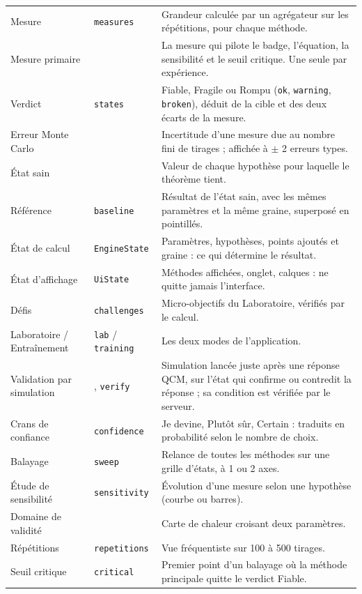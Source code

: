 \documentclass[11pt,a4paper]{article}
\begin{document}
\begin{appendices}
\begin{longtable}{@{}L{3.6cm} L{3.6cm} >{\raggedright\arraybackslash}p{\dimexpr\textwidth-7.2cm-4\tabcolsep\relax}@{}}
  Mesure & \texttt{measures} & Grandeur calculée par un agrégateur sur les répétitions, pour chaque méthode. \\
  Mesure primaire &  & La mesure qui pilote le badge, l'équation, la sensibilité et le seuil critique. Une seule par expérience. \\
  Verdict & \texttt{states} & Fiable, Fragile ou Rompu (\texttt{ok}, \texttt{warning}, \texttt{broken}), déduit de la cible et des deux écarts de la mesure. \\
  Erreur Monte Carlo &  & Incertitude d'une mesure due au nombre fini de tirages ; affichée à $\pm$ 2 erreurs types. \\
  État sain &  & Valeur de chaque hypothèse pour laquelle le théorème tient. \\
  Référence & \texttt{baseline} & Résultat de l'état sain, avec les mêmes paramètres et la même graine, superposé en pointillés. \\
  État de calcul & \texttt{EngineState} & Paramètres, hypothèses, points ajoutés et graine : ce qui détermine le résultat. \\
  État d'affichage & \texttt{UiState} & Méthodes affichées, onglet, calques : ne quitte jamais l'interface. \\
  Défis & \texttt{challenges} & Micro-objectifs du Laboratoire, vérifiés par le calcul. \\
  Laboratoire / Entraînement & \texttt{lab} / \texttt{training} & Les deux modes de l'application. \\
  Validation par simulation & , \texttt{verify} & Simulation lancée juste après une réponse QCM, sur l'état qui confirme ou contredit la réponse ; sa condition est vérifiée par le serveur. \\
  Crans de confiance & \texttt{confidence} & Je devine, Plutôt sûr, Certain : traduits en probabilité selon le nombre de choix. \\
  Balayage & \texttt{sweep} & Relance de toutes les méthodes sur une grille d'états, à 1 ou 2 axes. \\
  Étude de sensibilité & \texttt{sensitivity} & Évolution d'une mesure selon une hypothèse (courbe ou barres). \\
  Domaine de validité &  & Carte de chaleur croisant deux paramètres. \\
  Répétitions & \texttt{repetitions} & Vue fréquentiste sur 100 à 500 tirages. \\
  Seuil critique & \texttt{critical} & Premier point d'un balayage où la méthode principale quitte le verdict Fiable. \\

\end{longtable}
\end{appendices}
\end{document}
